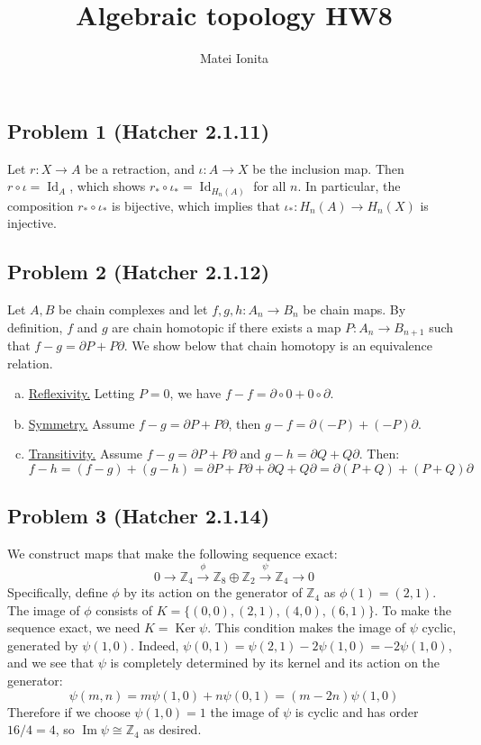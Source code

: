 \documentclass[12 pt]{article}
\title{Algebraic topology HW8}
\author{Matei Ionita}
\newcommand{\Z}{\mathbb{Z}}
\newcommand{\p}{\partial}
\DeclareMathOperator{\Ker}{Ker}
\DeclareMathOperator{\id}{Id}
\DeclareMathOperator{\imag}{Im}
\begin{document}
  \maketitle

\subsection*{Problem 1 (Hatcher 2.1.11)}
Let $r : X \to A$ be a retraction, and $\iota : A \to X$ be the inclusion map. Then $r \circ \iota = \id_A$,
which shows $r_* \circ \iota_* = \id_{H_n(A)}$ for all $n$. In particular, the composition $r_* \circ \iota_*$
is bijective, which implies that $\iota_*: H_n(A) \to H_n(X)$ is injective.


\subsection*{Problem 2 (Hatcher 2.1.12)}
Let $A, B$ be chain complexes and let $f, g,h : A_n \to B_n$ be chain maps. By definition, $f$ and $g$
are chain homotopic if there exists a map $P : A_n \to B_{n+1}$ such that $f - g = \p P + P \p$. We
show below that chain homotopy is an equivalence relation.
\begin{enumerate}[(a)]
\item \underline{Reflexivity.} Letting $P = 0$, we have $f - f = \p \circ 0 + 0 \circ \p$.
\item \underline{Symmetry.} Assume $f - g = \p P + P \p$, then $g - f = \p (-P) + (-P) \p$.
\item \underline{Transitivity.} Assume $f - g = \p P + P \p$ and $g-h = \p Q + Q \p$. Then:
	\[	f - h = (f-g) + (g-h) = \p P + P \p + \p Q + Q \p = \p (P + Q) + (P + Q) \p	\]
\end{enumerate}


\subsection*{Problem 3 (Hatcher 2.1.14)}
We construct maps that make the following sequence exact:
\[	0 \to \Z_4 \overset{\phi}{\to} \Z_8 \oplus \Z_2 \overset{\psi}{\to} \Z_4 \to 0	\]
Specifically, define $\phi$ by its action on the generator of $\Z_4$ as $\phi(1) = (2,1)$. The image of
$\phi$ consists of $K = \{(0,0),(2,1),(4,0),(6,1) \}$. To make the sequence exact, we need $K = \Ker \psi$.
This condition makes the image of $\psi$ cyclic, generated by $\psi(1,0)$. Indeed, $\psi(0,1) = \psi(2,1) -
2 \psi(1,0) = - 2 \psi(1,0)$, and we see that $\psi$ is completely determined by its kernel and its action
on the generator:
\[	\psi(m,n) = m \psi(1,0) + n \psi(0,1) = (m-2n) \psi(1,0)	\]
Therefore if we choose $\psi(1,0) = 1$ the image of $\psi$ is cyclic and has order $16/4 = 4$, so $\imag 
\psi \cong \Z_4$ as desired.
\end{document}
